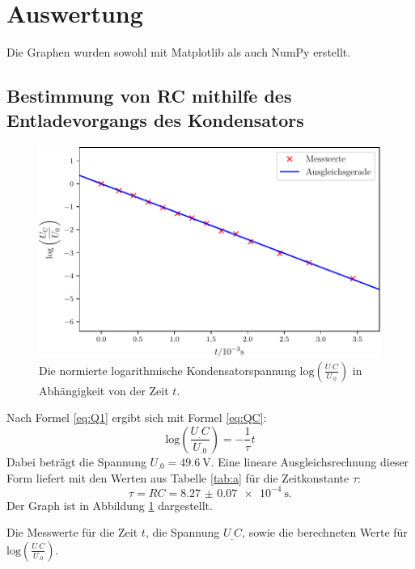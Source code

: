 \section{Auswertung}
\label{sec:Auswertung}

Die Graphen wurden sowohl mit Matplotlib \cite{matplotlib} als auch NumPy \cite{numpy} erstellt.

\subsection{Bestimmung von RC mithilfe des Entladevorgangs des Kondensators}
\label{subsec:1}
\begin{figure}
	\centering
	\includegraphics[width=\linewidth-70pt,height=\textheight-70pt,keepaspectratio]{content/images/Graph1.pdf}
	\caption{Die normierte logarithmische Kondensatorspannung $\mathrm{log}\left(\frac{U_.C}{U_.0}\right)$ in Abhängigkeit von der Zeit $t$.}
	\label{fig:Graph1}
\end{figure}

\noindent Nach Formel \eqref{eq:Q1} ergibt sich mit Formel \eqref{eq:QC}:
\[
\mathrm{log}\left(\frac{U_.C}{U_.0}\right) = -\frac{1}{\tau}t 
\]
Dabei beträgt die Spannung $U_.0 = \SI{49.6}{\volt}$.
Eine lineare Ausgleichsrechnung dieser Form liefert mit den Werten aus Tabelle \ref{tab:a} für die Zeitkonstante $\tau$:
\[
\tau = RC = \SI{8.27(7)e-4}{\second}\text{.}
\]
Der Graph ist in Abbildung \ref{fig:Graph1} dargestellt.

\begin{table}
	\centering
	\caption{Die Messwerte für die Zeit $t$, die Spannung $U_.C$, sowie die berechneten Werte für $\mathrm{log}\left(\frac{U_.C}{U_.0}\right)$.}
	
	\label{tab:a}
\end{table}

